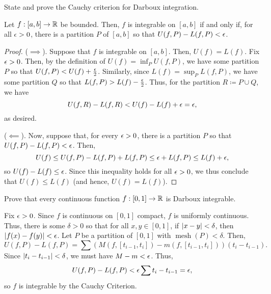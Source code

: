 \documentclass{article}
\DeclareMathOperator{\mesh}{mesh}
\begin{document}
\begin{problem}
State and prove the Cauchy criterion for Darboux integration.
\begin{solution}
	\begin{theorem*}
		Let $f : [a, b] \to \mathbb{R}$ be bounded.
		Then, $f$ is integrable on $[a, b]$ if and only if, for all $\epsilon > 0$, there is a partition $P$ of $[a, b]$ so that $U(f, P) - L(f, P) < \epsilon$.
	\end{theorem*}
	\begin{proof}
		($\implies$).
		Suppose that $f$ is integrable on $[a, b]$.
		Then, $U(f) = L(f)$.
		Fix $\epsilon > 0$.
		Then, by the definition of $U(f) = \inf_P U(f, P)$, we have some partition $P$ so that $U(f, P) < U(f) + \frac{\epsilon}2$.
		Similarly, since $L(f) = \sup_P L(f, P)$, we have some partition $Q$ so that $L(f, P) > L(f) - \frac{\epsilon}2$.
		Thus, for the partition $R \coloneq P \cup Q$, we have
		\[
			U(f, R) - L(f, R) < U(f) - L(f) + \epsilon = \epsilon,
		\]
		as desired.

		($\impliedby$).
		Now, suppose that, for every $\epsilon > 0$, there is a partition $P$ so that $U(f, P) - L(f, P) < \epsilon$.
		Then,
		\[
			U(f) \le U(f, P) - L(f, P) + L(f, P) \le \epsilon + L(f, P) \le L(f) + \epsilon,
		\]
		so $U(f) - L(f) \le \epsilon$.
		Since this inequality holds for all $\epsilon > 0$, we thus conclude that $U(f) \le L(f)$ (and hence, $U(f) = L(f)$).
	\end{proof}
\end{solution}
\end{problem}

\begin{problem}
Prove that every continuous function $f : [0, 1] \to \mathbb{R}$ is Darboux integrable.
\begin{solution}
	Fix $\epsilon > 0$.
	Since $f$ is continuous on $[0, 1]$ compact, $f$ is uniformly continuous.
	Thus, there is some $\delta > 0$ so that for all $x, y \in [0, 1]$, if $\abs{x - y} < \delta$, then $\abs{f(x) - f(y)} < \epsilon$.
	Let $P$ be a partition of $[0, 1]$ with $\mesh(P) < \delta$.
	Then,
	\[
		U(f, P) - L(f, P) = \sum (M(f, [t_{i - 1}, t_i]) - m(f, [t_{i - 1}, t_i])) (t_i - t_{i - 1}).
	\]
	Since $\abs{t_i - t_{i - 1}} < \delta$, we must have $M - m < \epsilon$.
	Thus,
	\[
		U(f, P) - L(f, P) < \epsilon \sum t_i - t_{i - 1} = \epsilon,
	\]
	so $f$ is integrable by the Cauchy Criterion.
\end{solution}
\end{problem}

\newpage
\end{document}
